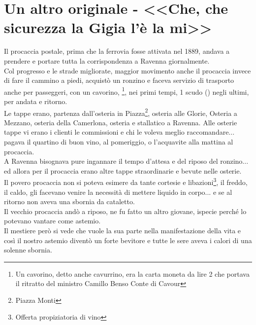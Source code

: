 
\chapter{Un altro originale - <<Che, che sicurezza la Gigia l'è la mi>>}
Il procaccia postale, prima che la ferrovia fosse attivata nel 1889, andava a prendere e portare tutta la corrispondenza a Ravenna giornalmente.\\
\indent Col progresso e le strade migliorate, maggior movimento anche il procaccia invece di fare il cammino a piedi, acquistò un ronzino e faceva servizio di trasporto anche per passeggeri, con un cavorino, \normalfont \:\:\footnote{Un cavorino, detto anche cavurrino, era la carta moneta da lire 2 che portava il ritratto del ministro Camillo Benso Conte di Cavour}, nei primi tempi, 1 scudo (\normalfont \:\:) negli ultimi, per andata e ritorno. \\
\indent Le tappe erano, partenza dall'osteria in Piazza\footnote{Piazza Monti}, osteria alle Glorie, Osteria a Mezzano, osteria della Camerlona, osteria e stallatico a Ravenna. Alle osterie tappe vi erano i clienti le commissioni e chi le voleva meglio raccomandare... pagava il quartino di buon vino, al pomeriggio, o l'acquavite alla mattina al procaccia.\\
\indent A Ravenna bisognava pure ingannare il tempo d'attesa e del riposo del ronzino... ed allora per il procaccia erano altre tappe straordinarie e bevute nelle osterie.\\
\indent Il povero procaccia non si poteva esimere da tante cortesie e libazioni\footnote{Offerta propiziatoria di vino}, il freddo, il caldo, gli facevano venire la necessità di mettere liquido in corpo... e se al ritorno non aveva una sbornia da cataletto.\\
\indent Il vecchio procaccia andò a riposo, ne fu fatto un altro giovane, ispecie perché lo potevano vantare come astemio.\\
\indent Il mestiere però si vede che vuole la sua parte nella manifestazione della vita e così il nostro astemio diventò un forte bevitore e tutte le sere aveva i calori di una solenne sbornia.\\
